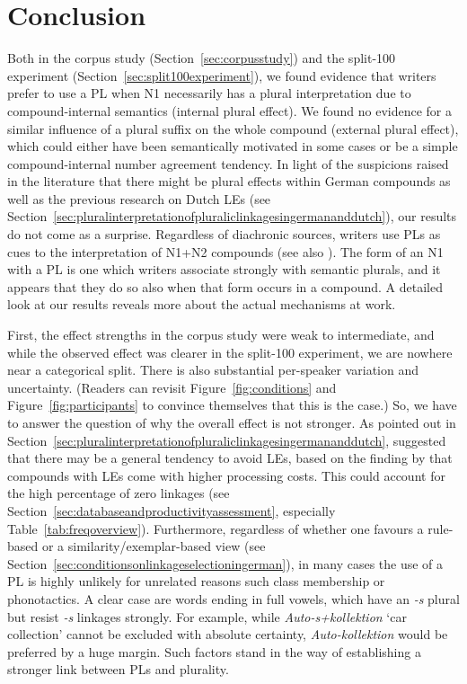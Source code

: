 \section{Conclusion}
\label{sec:conclusion}

Both in the corpus study (Section~\ref{sec:corpusstudy}) and the split-100 experiment (Section~\ref{sec:split100experiment}), we found evidence that writers prefer to use a PL when N1 necessarily has a plural interpretation due to compound-internal semantics (internal plural effect).
We found no evidence for a similar influence of a plural suffix on the whole compound (external plural effect), which could either have been semantically motivated in some cases or be a simple compound-internal number agreement tendency.
In light of the suspicions raised in the literature that there might be plural effects within German compounds as well as the previous research on Dutch LEs (see Section~\ref{sec:pluralinterpretationofpluraliclinkagesingermananddutch}), our results do not come as a surprise.
Regardless of diachronic sources, writers use PLs as cues to the interpretation of N1+N2 compounds (see also \citealt[212]{BangaEa2013b}).
The form of an N1 with a PL is one which writers associate strongly with semantic plurals, and it appears that they do so also when that form occurs in a compound.
A detailed look at our results reveals more about the actual mechanisms at work.

First, the effect strengths in the corpus study were weak to intermediate, and while the observed effect was clearer in the split-100 experiment, we are nowhere near a categorical split.
There is also substantial per-speaker variation and uncertainty.
(Readers can revisit Figure~\ref{fig:conditions} and Figure~\ref{fig:participants} to convince themselves that this is the case.)
So, we have to answer the question of why the overall effect is not stronger.
As pointed out in Section~\ref{sec:pluralinterpretationofpluraliclinkagesingermananddutch}, \textcite[45]{BangaEa2013a} suggested that there may be a general tendency to avoid LEs, based on the finding by \textcite{LibbenEa2002} that compounds with LEs come with higher processing costs.
This could account for the high percentage of zero linkages (see Section~\ref{sec:databaseandproductivityassessment}, especially Table~\ref{tab:freqoverview}).
Furthermore, regardless of whether one favours a rule-based or a similarity\slash exemplar-based view (see Section~\ref{sec:conditionsonlinkageselectioningerman}), in many cases the use of a PL is highly unlikely for unrelated reasons such class membership or phonotactics.
A clear case are words ending in full vowels, which have an \textit{-s} plural but resist \textit{-s} linkages strongly.
For example, while \textit{Auto-s+kollektion} `car collection' cannot be excluded with absolute certainty, \textit{Auto-kollektion} would be preferred by a huge margin.
Such factors stand in the way of establishing a stronger link between PLs and plurality.


